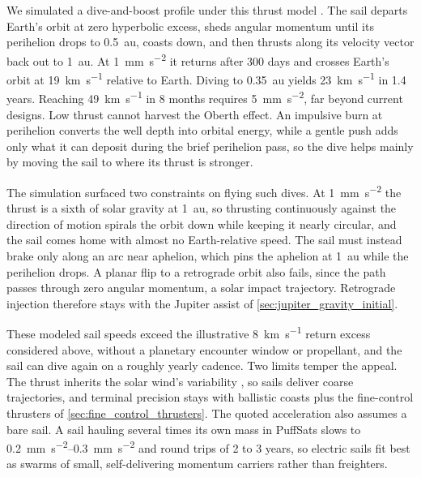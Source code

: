 \documentclass{article}
\begin{document}
We simulated a dive-and-boost profile under this thrust model \cite{katz_esail_sim_2026}. The sail departs Earth's orbit at zero hyperbolic excess, sheds angular momentum until its perihelion drops to \SI{0.5}{\astronomicalunit}, coasts down, and then thrusts along its velocity vector back out to \SI{1}{\astronomicalunit}. At \SI{1}{\milli\meter\per\second\squared} it returns after 300 days and crosses Earth's orbit at \SI{19}{\kilo\meter\per\second} relative to Earth. Diving to \SI{0.35}{\astronomicalunit} yields \SI{23}{\kilo\meter\per\second} in 1.4 years. Reaching \SI{49}{\kilo\meter\per\second} in 8 months requires \SI{5}{\milli\meter\per\second\squared}, far beyond current designs. Low thrust cannot harvest the Oberth effect. An impulsive burn at perihelion converts the well depth into orbital energy, while a gentle push adds only what it can deposit during the brief perihelion pass, so the dive helps mainly by moving the sail to where its thrust is stronger.

The simulation surfaced two constraints on flying such dives. At \SI{1}{\milli\meter\per\second\squared} the thrust is a sixth of solar gravity at \SI{1}{\astronomicalunit}, so thrusting continuously against the direction of motion spirals the orbit down while keeping it nearly circular, and the sail comes home with almost no Earth-relative speed. The sail must instead brake only along an arc near aphelion, which pins the aphelion at \SI{1}{\astronomicalunit} while the perihelion drops. A planar flip to a retrograde orbit also fails, since the path passes through zero angular momentum, a solar impact trajectory. Retrograde injection therefore stays with the Jupiter assist of \autoref{sec:jupiter_gravity_initial}.

These modeled sail speeds exceed the illustrative \SI{8}{\kilo\meter\per\second} return excess considered above, without a planetary encounter window or propellant, and the sail can dive again on a roughly yearly cadence. Two limits temper the appeal. The thrust inherits the solar wind's variability \cite{janhunen_sandroos2007_esail}, so sails deliver coarse trajectories, and terminal precision stays with ballistic coasts plus the fine-control thrusters of \autoref{sec:fine_control_thrusters}. The quoted acceleration also assumes a bare sail. A sail hauling several times its own mass in PuffSats slows to \SIrange[range-phrase={--},range-units=single]{0.2}{0.3}{\milli\meter\per\second\squared} and round trips of 2 to 3 years, so electric sails fit best as swarms of small, self-delivering momentum carriers rather than freighters.
\end{document}
